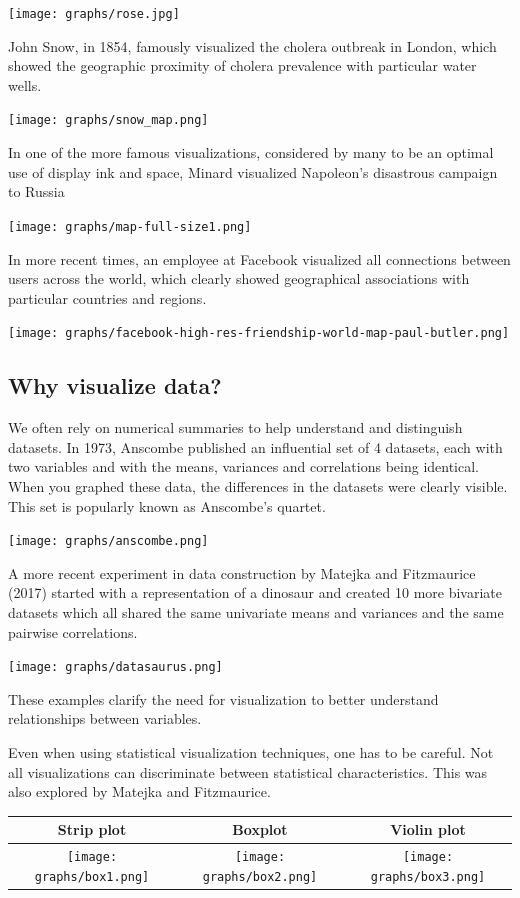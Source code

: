 \documentclass[
  letterpaper,
]{scrbook}
\begin{document}
\texttt{[image: graphs/rose.jpg]}

John Snow, in 1854, famously visualized the cholera outbreak in London, which showed the geographic proximity of cholera prevalence with particular water wells.

\texttt{[image: graphs/snow\_map.png]}

In one of the more famous visualizations, considered by many to be an optimal use of display ink and space, Minard visualized Napoleon's disastrous campaign to Russia

\texttt{[image: graphs/map-full-size1.png]}

In more recent times, an employee at Facebook visualized all connections between users across the world, which clearly showed geographical associations with particular countries and regions.

\texttt{[image: graphs/facebook-high-res-friendship-world-map-paul-butler.png]}

\hypertarget{why-visualize-data}{%
\subsection{Why visualize data?}\label{why-visualize-data}}

We often rely on numerical summaries to help understand and distinguish datasets. In 1973, Anscombe published an influential set of 4 datasets, each with two variables and with the means, variances and correlations being identical. When you graphed these data, the differences in the datasets were clearly visible. This set is popularly known as Anscombe's quartet.

\texttt{[image: graphs/anscombe.png]}

A more recent experiment in data construction by Matejka and Fitzmaurice (2017) started with a representation of a dinosaur and created 10 more bivariate datasets which all shared the same univariate means and variances and the same pairwise correlations.

\texttt{[image: graphs/datasaurus.png]}

These examples clarify the need for visualization to better understand relationships between variables.

Even when using statistical visualization techniques, one has to be careful. Not all visualizations can discriminate between statistical characteristics. This was also explored by Matejka and Fitzmaurice.

\begin{longtable}[]{@{}ccc@{}}
\toprule
Strip plot & Boxplot & Violin plot\tabularnewline
\midrule
\endhead
\texttt{[image: graphs/box1.png]} & \texttt{[image: graphs/box2.png]} & \texttt{[image: graphs/box3.png]}\tabularnewline
\bottomrule
\end{longtable}
\end{document}
